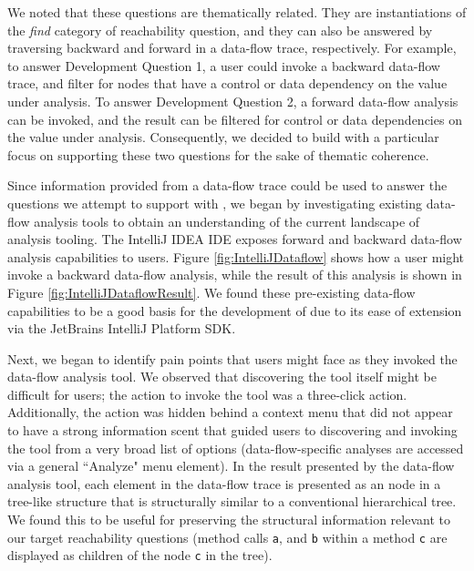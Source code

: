 \par We noted that these questions are thematically related. They are instantiations 
of the \textit{find} category of reachability question, and they can also be
answered by traversing backward and forward in a data-flow trace, respectively.
For example, to answer Development Question 1, a user could invoke a backward
data-flow trace, and filter for nodes that have a control or data dependency
on the value under analysis.
To answer Development Question 2, a forward data-flow analysis can be invoked,
and the result can be filtered for control or data dependencies on the value
under analysis.
Consequently, we decided to build \toolname{} with a particular focus on
supporting these two questions for the sake of thematic coherence.

\par Since information provided from a data-flow trace could be used to answer
the questions we attempt to support with \toolname{}, we began by investigating 
existing data-flow analysis tools to obtain an understanding of the current 
landscape of analysis tooling.
The IntelliJ IDEA \ac{IDE} exposes forward and backward data-flow analysis
capabilities to users.
Figure \ref{fig:IntelliJDataflow} shows how a user might invoke a backward 
data-flow analysis, while the result of this analysis is shown in
Figure \ref{fig:IntelliJDataflowResult}.
We found these pre-existing data-flow capabilities to be a good basis for the 
development of \toolname{} due to its ease of extension via the JetBrains 
IntelliJ Platform \ac{SDK}.

\par Next, we began to identify pain points that users might face as they
invoked the data-flow analysis tool.
We observed that discovering the tool itself might be difficult for
users; the action to invoke the tool was a three-click action.
Additionally, the action was hidden behind a context menu that did not appear
to have a strong information scent that guided users to discovering and invoking
the tool from a very broad list of options (\ie data-flow-specific analyses
are accessed via a general ``Analyze" menu element).
In the result presented by the data-flow analysis tool, each element in the 
data-flow trace is presented as an node in a tree-like structure that is 
structurally similar to a conventional hierarchical tree.
We found this to be useful for preserving the structural information relevant
to our target reachability questions (\eg method calls \texttt{a}, and \texttt{b}
within a method \texttt{c} are displayed as children of the node \texttt{c} in
the tree).

